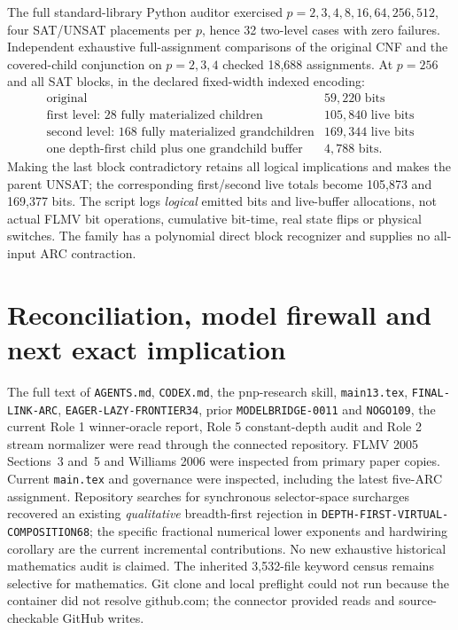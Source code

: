 \documentclass[11pt]{article}
\begin{document}
The full standard-library Python auditor exercised $p=2,3,4,8,16,64,256,512$, four SAT/UNSAT placements per $p$, hence 32 two-level cases with zero failures. Independent exhaustive full-assignment comparisons of the original CNF and the covered-child conjunction on $p=2,3,4$ checked 18,688 assignments. At $p=256$ and all SAT blocks, in the declared fixed-width indexed encoding:
\[
\begin{array}{l|r}
\text{original} & 59{,}220\text{ bits}\\
\text{first level: 28 fully materialized children} &105{,}840\text{ live bits}\\
\text{second level: 168 fully materialized grandchildren}&169{,}344\text{ live bits}\\
\text{one depth-first child plus one grandchild buffer}&4{,}788\text{ bits}.
\end{array}
\]
Making the last block contradictory retains all logical implications and makes the parent UNSAT; the corresponding first/second live totals become 105,873 and 169,377 bits. The script logs \emph{logical} emitted bits and live-buffer allocations, not actual FLMV bit operations, cumulative bit-time, real state flips or physical switches. The family has a polynomial direct block recognizer and supplies no all-input ARC contraction.

\section{Reconciliation, model firewall and next exact implication}
The full text of \texttt{AGENTS.md}, \texttt{CODEX.md}, the pnp-research skill, \texttt{main13.tex}, \texttt{FINAL-LINK-ARC}, \texttt{EAGER-LAZY-FRONTIER34}, prior \texttt{MODELBRIDGE-0011} and \texttt{NOGO109}, the current Role 1 winner-oracle report, Role 5 constant-depth audit and Role 2 stream normalizer were read through the connected repository. FLMV 2005 Sections~3 and~5 and Williams 2006 were inspected from primary paper copies. Current \texttt{main.tex} and governance were inspected, including the latest five-ARC assignment. Repository searches for synchronous selector-space surcharges recovered an existing \emph{qualitative} breadth-first rejection in \texttt{DEPTH-FIRST-VIRTUAL-COMPOSITION68}; the specific fractional numerical lower exponents and hardwiring corollary are the current incremental contributions. No new exhaustive historical mathematics audit is claimed. The inherited 3,532-file keyword census remains selective for mathematics. Git clone and local preflight could not run because the container did not resolve github.com; the connector provided reads and source-checkable GitHub writes.
\end{document}
